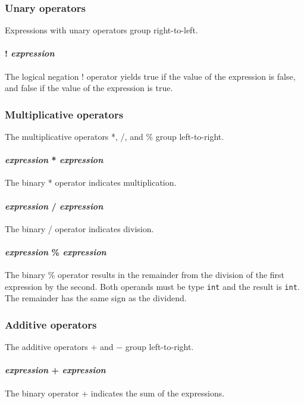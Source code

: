 \subsubsection{Unary operators}
Expressions with unary operators group right-to-left.

\paragraph{! \textit{expression}}
The logical negation ! operator yields true if the value of the expression is false, and false if the value of the expression is true. 

\subsubsection{Multiplicative operators}
The multiplicative operators *, /, and \% group left-to-right.

\paragraph{\textit{expression} * \textit{expression}}
The binary * operator indicates multiplication.

\paragraph{\textit{expression} / \textit{expression}}
The binary / operator indicates division.

\paragraph{\textit{expression} \% \textit{expression}}
The  binary \% operator results in the remainder from the division of the first expression by the second. Both operands must be type \texttt{int} and the result is \texttt{int}. The remainder has the same sign as the dividend.
\\
\subsubsection{Additive operators}
The additive operators $+$ and $-$ group left-to-right.

\paragraph{\textit{expression} + \textit{expression}}
The binary  operator + indicates the sum of the expressions.

